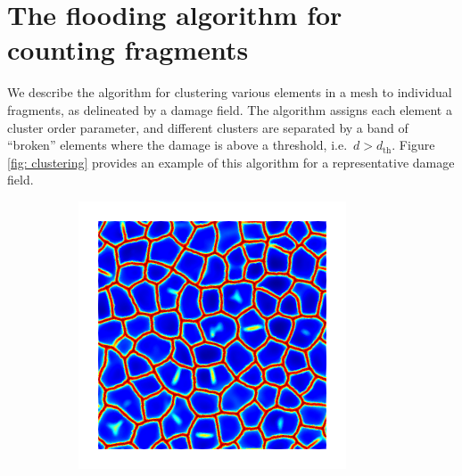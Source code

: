 \chapter{The flooding algorithm for counting fragments}
\label{appendix: flooding}

We describe the algorithm for clustering various elements in a mesh to individual fragments, as delineated by a damage field.
The algorithm assigns each element a cluster order parameter, and different clusters are separated by a band of ``broken'' elements where the damage is above a threshold, i.e.\ $d > d_{\text{th}}$. Figure \ref{fig: clustering} provides an example of this algorithm for a representative damage field.

\begin{figure}[htb!]
  \centering
  \begin{subfigure}[b]{0.375\textwidth}
    \includegraphics[width=\textwidth]{Appendices/figures/damage.png}
    \caption{}
  \end{subfigure}
  \begin{subfigure}[b]{0.36\textwidth}

\end{subfigure}
\end{figure}
